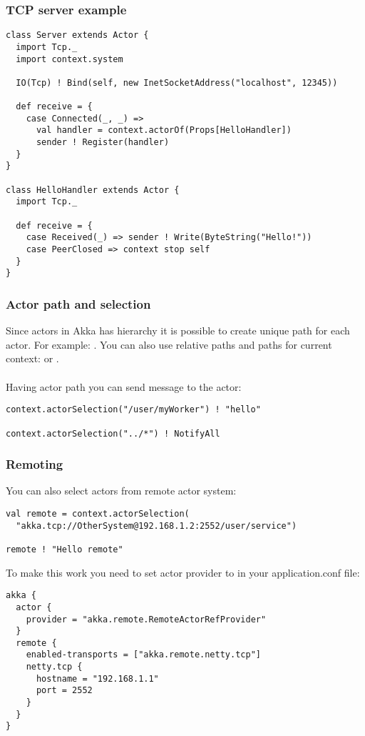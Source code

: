 \begin{frame}[fragile]
\frametitle{TCP server example}
\begin{lstlisting}
class Server extends Actor {
  import Tcp._
  import context.system

  IO(Tcp) ! Bind(self, new InetSocketAddress("localhost", 12345))

  def receive = {
    case Connected(_, _) =>
      val handler = context.actorOf(Props[HelloHandler])
      sender ! Register(handler)
  }
}

class HelloHandler extends Actor {
  import Tcp._

  def receive = {
    case Received(_) => sender ! Write(ByteString("Hello!"))
    case PeerClosed => context stop self
  }
}
\end{lstlisting}
\end{frame}

\begin{frame}[fragile]
\frametitle{Actor path and selection}
Since actors in Akka has hierarchy it is possible to create unique path for each actor.
For example: . You can also use relative paths
and paths for current context:  or .\\~\\

Having actor path you can send message to the actor:
\begin{lstlisting}
context.actorSelection("/user/myWorker") ! "hello"

context.actorSelection("../*") ! NotifyAll
\end{lstlisting}
\end{frame}

\begin{frame}[fragile]
\frametitle{Remoting}
You can also select actors from remote actor system:
\begin{lstlisting}
val remote = context.actorSelection(
  "akka.tcp://OtherSystem@192.168.1.2:2552/user/service")

remote ! "Hello remote"
\end{lstlisting}
To make this work you need to set actor provider to 
in your application.conf file:
\begin{lstlisting}
akka {
  actor {
    provider = "akka.remote.RemoteActorRefProvider"
  }
  remote {
    enabled-transports = ["akka.remote.netty.tcp"]
    netty.tcp {
      hostname = "192.168.1.1"
      port = 2552
    }
  }
}
\end{lstlisting}
\end{frame}

